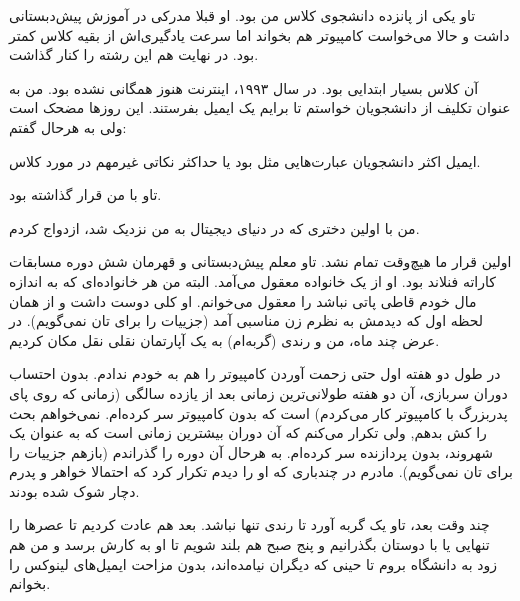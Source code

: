 تاو یکی از پانزده دانشجوی کلاس من بود. او قبلا مدرکی در آموزش
پیش‌دبستانی داشت و حالا می‌خواست کامپیوتر هم بخواند اما سرعت یادگیری‌اش
از بقیه کلاس کمتر بود. در نهایت هم این رشته را کنار گذاشت.

آن کلاس بسیار ابتدایی بود. در سال ۱۹۹۳، اینترنت هنوز همگانی نشده
بود. من به عنوان تکلیف از دانشجویان خواستم تا برایم یک ایمیل
بفرستند. این روزها مضحک است ولی به هرحال گفتم: 

ایمیل اکثر دانشجویان عبارت‌هایی مثل  بود یا حداکثر
نکاتی غیرمهم در مورد کلاس.

تاو با من قرار گذاشته بود. 

من با اولین دختری که در دنیای دیجیتال به من نزدیک شد، ازدواج کردم.

اولین قرار ما هیچ‌وقت تمام نشد. تاو معلم پیش‌دبستانی و قهرمان شش دوره
مسابقات کاراته فنلاند بود. او از یک خانواده معقول می‌آمد. البته من هر
خانواده‌ای که به اندازه مال خودم قاطی پاتی نباشد را معقول می‌خوانم. او
کلی دوست داشت و از همان لحظه اول که دیدمش به نظرم زن مناسبی آمد
(جزییات را برای تان نمی‌گویم). در عرض چند ماه، من و رندی (گربه‌ام) به یک
آپارتمان نقلی نقل مکان کردیم.

در طول دو هفته اول حتی زحمت آوردن کامپیوتر را هم به خودم ندادم. بدون
احتساب دوران سربازی، آن دو هفته طولانی‌ترین زمانی بعد از یازده سالگی
(زمانی که روی پای پدربزرگ‌ با کامپیوتر کار می‌کردم) است که بدون کامپیوتر
سر کرده‌ام. نمی‌خواهم بحث را کش بدهم, ولی تکرار می‌کنم که آن دوران
بیشترین زمانی است که به عنوان یک شهروند، بدون پردازنده سر کرده‌ام. به
هرحال آن دوره را گذراندم (بازهم جزییات را برای تان نمی‌گویم). مادرم در
چندباری که او را دیدم تکرار کرد که  احتمالا خواهر و پدرم دچار شوک شده بودند.

چند وقت بعد، تاو یک گربه آورد تا رندی تنها نباشد. بعد هم عادت کردیم تا
عصرها را تنهایی یا با دوستان بگذرانیم و پنج صبح هم بلند شویم تا او به
کارش برسد و من هم زود به دانشگاه بروم تا حینی که دیگران نیامده‌اند،
بدون مزاحت ایمیل‌های لینوکس را بخوانم.
